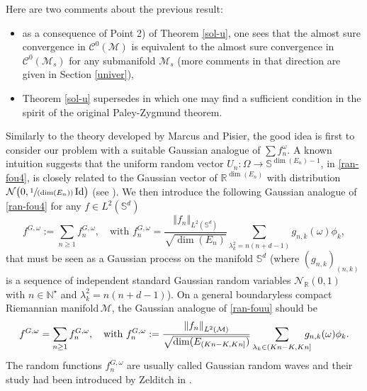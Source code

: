 \documentclass[JEP,XML,SOM,Unicode,NoEqCountersInSection,published]{cedram}
\newcommand{\spfrac}[2]{\sfrac{#1}{(#2)}}
\theoremstyle{theorem}
\theoremstyle{definition}
\newcommand\R{\mathbb{R}}
\newcommand\N{\mathbb{N}}
\newcommand\bbS{\mathbb{S}}
\begin{document}
Here are two comments about the previous result:
\begin{itemize}
\item as a consequence of Point 2) of Theorem \ref{sol-u}, one sees that the almost sure convergence in $\mathcal{C}^0(\mathcal{M})$ is equivalent to the almost sure convergence in $\mathcal{C}^0(\mathcal{M}_s)$ for any submanifold $\mathcal{M}_s$ (more comments in that direction are given in Section \ref{univer}),
\item Theorem \ref{sol-u} supersedes \cite[Th.\,2.1]{imek-aif} in which one may find a sufficient condition in the spirit of the original Paley-Zygmund theorem.
\end{itemize}

Similarly to the theory developed by Marcus and Pisier, the good idea is first to consider our problem with a suitable Gaussian analogue of $\sum f_n^\omega$.
A known intuition suggests that the uniform random vector $U_n:\Omega\to \bbS^{\dim(E_n)-1}$, in \eqref{ran-fou4}, is closely related to the Gaussian vector of $\R^{\dim(E_n)}$ with distribution $\mathcal{N}\bigl(0,\spfrac{1}{\dim(E_n)}\operatorname{Id}\bigr)$ (see \cite[p.\,58]{pisiervol}). We then introduce the following Gaussian analogue of \eqref{ran-fou4} for any $f\in L^2(\bbS^d)$\vspace*{-3pt}
\begin{equation}\label{ran-fouG}
f^{G,\omega}:=\sum_{n\geq 1} f_n^{G,\omega}, \quad \text{with } f_n^{G,\omega}= \frac{\left\Vert f_n\right\Vert_{L^2(\bbS^d)}}{\sqrt{\dim(E_n)}}\sum_{\lambda_k^2=n(n+d-1)} g_{n,k} (\omega)\phi_k,
\end{equation}
that must be seen as a Gaussian process on the manifold $\bbS^d$ (where $(g_{n,k})_{(n,k)}$ is a sequence of independent standard Gaussian random variables $\mathcal{N}_\R(0,1)$ with $n\in \N^\star$ and $\lambda_k^2=n(n+d-1)$).
On a general boundaryless compact Riemannian manifold\,$\mathcal{M}$, the Gaussian analogue of \eqref{ran-fouu} should be\vspace*{-3pt}
\begin{equation} \label{ran-fouG2}
f^{G,\omega} = \sum_{n\geq 1}f_n^{G,\omega}, \quad \text{with } f_n^{G,\omega}:=\frac{\left\Vert f_n\right\Vert_{L^2(\mathcal{M})}}{\sqrt{\dim(E_{(Kn-K,Kn]})}}\sum_{\lambda_k \in (Kn-K,Kn]}\hspace*{-3mm} g_{n,k}(\omega) \phi_k.
\end{equation}
The random functions $f_n^{G,\omega}$ are usually called Gaussian random waves and their study had been introduced by Zelditch in \cite{zelditch2009real}.
\end{document}
